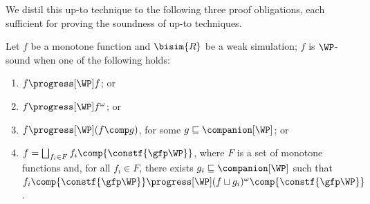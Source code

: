 We distil this up-to technique to the following three proof obligations, each sufficient for proving the soundness of up-to techniques.
\begin{lemma}\label{lem:prfs}
  Let $f$ be a monotone function and $\bisim{R}$ be a weak simulation; $f$ is $\WP$-sound when one of the following holds:
  \begin{enumerate}
    \item \label{lem:prfs-1}
      $f\progress[\WP]f$; or

    \item \label{lem:prfs-1.2}
      $f\progress[\WP]f^\omega$; or

    \item \label{lem:prfs-2}
      $f\progress[\WP](f\comp g)$, for some $g\sqsubseteq\companion[\WP]$; or


    \item \label{lem:prfs-3}
      $f = \bigsqcup_{f_i\in F}f_i\comp{\constf{\gfp\WP}}$,
      where $F$ is a set of monotone functions and, 
      for all $f_i\in F$, there exists $g_i\sqsubseteq\companion[\WP]$ such that
      $f_i\comp{\constf{\gfp\WP}}\progress[\WP](f\sqcup g_i)^{\omega}\comp{\constf{\gfp\WP}}$.

 \end{enumerate}
\end{lemma}
